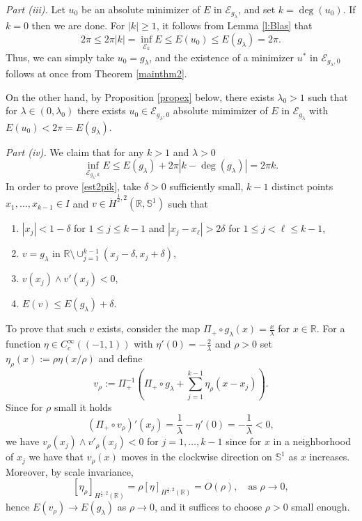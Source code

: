 \documentclass[12pt, a4paper]{article}
\newcommand{\M}[1]{\mathcal{#1}}
\newcommand{\sph}{\mathbb{S}}
\newcommand{\R}{\mathbb{R}}
\renewcommand{\(}{\left(}
\renewcommand{\)}{\right)}
\begin{document}
\medskip

\noindent\emph{Part (iii).} Let $u_0$ be an absolute minimizer of $E$ in $\M{E}_{g_\lambda}$, and set $k=\deg(u_0)$. If $k=0$ then we are done. For $|k|\geq1 $,  it follows from  Lemma \ref{l:Blas} that  $$2\pi\leq2\pi|k|=\inf_{\M{E}_k} E\leq E(u_0)\leq E(g_\lambda)=2\pi. $$ Thus, we can simply take $u_0=g_\lambda$,  and  the existence of a minimizer $u^*$ in $\M{E}_{g_\lambda,0}$ follows at once from Theorem \ref{mainthm2}. 

On the other hand, by Proposition \ref{propex} below, there exists $\lambda_0>1$ such that for $\lambda\in (0,\lambda_0)$ there exists $u_0\in \M{E}_{g_\lambda,0}$ absolute mimimizer of $E$ in $\M{E}_{g_\lambda}$ with $E(u_0)<2\pi=E(g_\lambda)$.

\medskip

\noindent\emph{Part (iv).} We claim that for any $k>1$ and $\lambda>0$
\begin{equation}\label{est2pik}
\inf_{\M{E}_{g_\lambda,k}}E\le E(g_\lambda)+ 2\pi|k-\deg(g_\lambda)|= 2\pi k.
\end{equation}
In order to prove \eqref{est2pik}, take $\delta>0$ sufficiently small, $k-1$ distinct points $x_1,\dots, x_{k-1}\in I$ and $v\in \dot H^{\frac{1}{2},2}(\R,\sph^1)$ such that 
\begin{enumerate}
\item $|x_j|<1-\delta$ for $1\le j\le k-1$ and $|x_j-x_\ell|>2\delta$ for $1\le j<\ell\le k-1$,
\item $v=g_\lambda$ in $\R\setminus \cup_{j=1}^{k-1} (x_j-\delta,x_j+\delta)$,
\item $v(x_j)\wedge v'(x_j)<0$,
\item $E(v)\le E(g_\lambda)+\delta.$
\end{enumerate}
To prove that such $v$ exists, consider the map $\Pi_+\circ g_\lambda(x)=\frac{x}{\lambda}$ for $x\in \R$. For a function $\eta\in C^\infty_c((-1,1))$ with $\eta'(0)=-\frac{2}{\lambda}$ and $\rho>0$ set $\eta_\rho(x):=\rho\eta(x/\rho)$ and define
$$v_\rho:= \Pi_+^{-1}\(\Pi_+\circ g_\lambda +\sum_{j=1}^{k-1} \eta_\rho(x-x_j)\).$$
Since for $\rho$ small it holds 
$$(\Pi_+\circ v_\rho)'(x_j)=\frac{1}{\lambda}-\eta'(0)=-\frac{1}{\lambda}<0,$$
we have $v_\rho(x_j)\wedge v'_\rho(x_j)<0$ for $j=1,\dots,k-1$ since for $x$ in a neighborhood of $x_j$ we have that $v_\rho(x)$ moves in the clockwise direction on $\sph^1$ as $x$ increases. Moreover, by scale invariance,
$$[\eta_\rho]_{H^{\frac{1}{2},2}(\R)}=\rho [\eta]_{H^{\frac{1}{2},2}(\R)}=O(\rho), \quad  \text{as }\rho\to 0,$$ hence $E(v_\rho)\to E(g_\lambda)$ as $\rho\to 0$, and it suffices to choose $\rho>0$ small enough.
\end{document}
